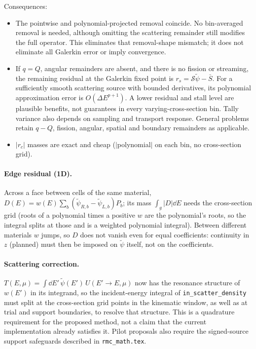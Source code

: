 \documentclass[11pt]{article}
\newcommand{\tpsi}{\tilde\psi}
\newcommand{\Sbar}{\bar S}
\begin{document}
\noindent Consequences:
\begin{itemize}
  \item The pointwise and polynomial-projected removal coincide. No bin-averaged
  removal is needed, although omitting the scattering remainder still modifies the
  full operator. This eliminates that removal-shape mismatch; it does not eliminate
  all Galerkin error or imply convergence.
  \item If $q=Q$, angular remainders are absent, and there is no fission or streaming,
  the remaining residual at the Galerkin fixed point is
  $r_s=\mathcal S\tpsi-\Sbar$. For a sufficiently smooth scattering source with
  bounded derivatives, its polynomial approximation error is
  $O(\Delta E^{p+1})$. A lower residual and stall level are plausible benefits,
  not guarantees in every varying-cross-section bin. Tally variance also depends
  on sampling and transport response. General problems retain $q-Q$, fission,
  angular, spatial and boundary remainders as applicable.
  \item $|r_c|$ masses are exact and cheap ($|$polynomial$|$ on each bin, no
  cross-section grid).
\end{itemize}

\paragraph{Edge residual (1D).} Across a face between cells of the same material,
$D(E) = w(E)\sum_b(\tpsi_{R,b}-\tpsi_{L,b})P_b$; its mass $\int_g|D|\dd E$ needs the
cross-section grid (roots of a polynomial times a positive $w$ are the polynomial's
roots, so the integral splits at those and is a weighted polynomial integral). Between
different materials $w$ jumps, so $D$ does not vanish even for equal coefficients:
continuity in $z$ (planned) must then be imposed on $\tpsi$ itself, not on the
coefficients.

\paragraph{Scattering correction.} $T(E,\mu) = \int\dd E'\,\tpsi(E')\,U(E'\to E,\mu)$
now has the resonance structure of $w(E')$ in its integrand, so the incident-energy
integral of \texttt{in\_scatter\_density} must split at the cross-section grid points
in the kinematic window, as well as at trial and support boundaries, to resolve
that structure. This is a quadrature requirement for the proposed method, not
a claim that the current implementation already satisfies it. Pilot proposals
also require the signed-source support safeguards described in \texttt{rmc\_math.tex}.
\end{document}
